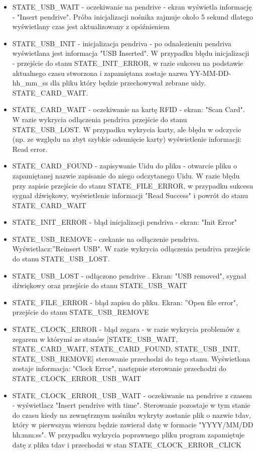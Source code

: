 \documentclass[declaration,shortabstract, mgr]{iithesis}
\begin{document}
\begin{itemize}
\item STATE\_USB\_WAIT - oczekiwanie na pendrive - ekran wyświetla informację - "Insert pendrive". Próba inicjalizacji nośnika zajmuje około 5 sekund dlatego wyświetlany czas jest aktualizowany z opóźnieniem
\item STATE\_USB\_INIT - inicjalizacja pendriva - po odnalezieniu pendriva wyświetlana jest informacja "USB Inserted". W przypadku błędu inicjalizacji - przejście do stanu STATE\_INIT\_ERROR, w razie sukcesu na podstawie aktualnego czasu stworzona i zapamiętana zostaje nazwa YY-MM-DD-hh\_mm\_ss dla pliku który będzie przechowywał zebrane uidy. STATE\_CARD\_WAIT.
\item STATE\_CARD\_WAIT - oczekiwanie na kartę RFID - ekran: "Scan Card". W razie wykrycia odłączenia pendriva przejście do stanu STATE\_USB\_LOST. W przypadku wykrycia karty, ale błędu w odczycie (np. ze względu na zbyt szybkie odsunięcie karty) wyświetlenie informacji: Read error.
\item STATE\_CARD\_FOUND - zapisywanie Uidu do pliku - otwarcie pliku o zapamiętanej nazwie zapisanie do niego odczytanego Uidu. W razie błędu przy zapisie przejście do stanu STATE\_FILE\_ERROR, w przypadku sukcesu sygnał dźwiękowy, wyświetlenie informacji "Read Success" i powrót do stanu STATE\_CARD\_WAIT
\item STATE\_INIT\_ERROR - błąd inicjalizacji pendriva - ekran: "Init Error"
\item STATE\_USB\_REMOVE - czekanie na odłączenie pendriva. Wyświetlacz:''Reinsert USB". W razie wykrycia odłączenia pendriva przejście do stanu STATE\_USB\_LOST.
\item STATE\_USB\_LOST - odłączono pendrive . Ekran: "USB removed", sygnał dźwiękowy oraz przejście do stanu STATE\_USB\_WAIT
\item STATE\_FILE\_ERROR - błąd zapisu do pliku. Ekran: ''Open file error", przejście do stanu STATE\_USB\_REMOVE
\item STATE\_CLOCK\_ERROR - błąd zegara - w razie wykrycia problemów z zegarem w którymś ze stanów [STATE\_USB\_WAIT, STATE\_CARD\_WAIT, STATE\_CARD\_FOUND, STATE\_USB\_INIT, STATE\_USB\_REMOVE] sterowanie przechodzi do tego stanu. Wyświetlona zostaje informacja: "Clock Error", następnie sterowanie przechodzi do STATE\_CLOCK\_ERROR\_USB\_WAIT
\item STATE\_CLOCK\_ERROR\_USB\_WAIT - oczekiwanie na pendrive z czasem - wyświetlacz "Insert pendrive with time". Sterowanie pozostaje w tym stanie do czasu kiedy na zewnętrznym nośniku wykryty zostanie plik o nazwie tdav, który w pierwszym wierszu będzie zawierał datę w formacie "YYYY/MM/DD hh:mm:ss". W przypadku wykrycia poprawnego pliku program zapamiętuje datę z pliku tdav i przechodzi w stan STATE\_CLOCK\_ERROR\_CLICK\\

\end{itemize}
\end{document}
